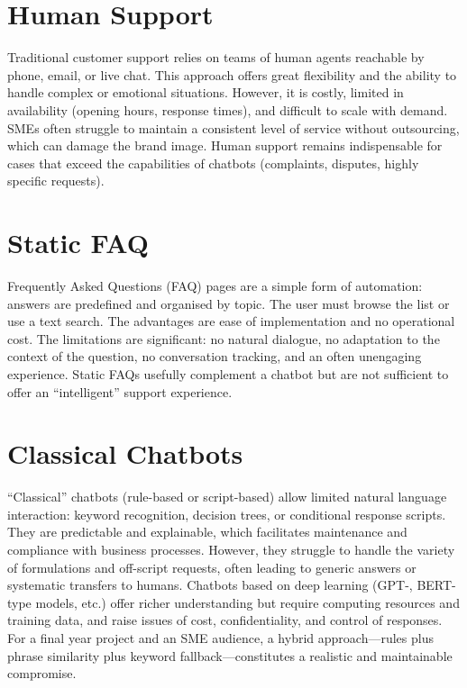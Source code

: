 \documentclass[12pt,a4paper]{report}
\begin{document}
\section{Human Support}

Traditional customer support relies on teams of human agents reachable by phone, email, or live chat. This approach offers great flexibility and the ability to handle complex or emotional situations. However, it is costly, limited in availability (opening hours, response times), and difficult to scale with demand. SMEs often struggle to maintain a consistent level of service without outsourcing, which can damage the brand image. Human support remains indispensable for cases that exceed the capabilities of chatbots (complaints, disputes, highly specific requests).

\section{Static FAQ}

Frequently Asked Questions (FAQ) pages are a simple form of automation: answers are predefined and organised by topic. The user must browse the list or use a text search. The advantages are ease of implementation and no operational cost. The limitations are significant: no natural dialogue, no adaptation to the context of the question, no conversation tracking, and an often unengaging experience. Static FAQs usefully complement a chatbot but are not sufficient to offer an ``intelligent'' support experience.

\section{Classical Chatbots}

``Classical'' chatbots (rule-based or script-based) allow limited natural language interaction: keyword recognition, decision trees, or conditional response scripts. They are predictable and explainable, which facilitates maintenance and compliance with business processes. However, they struggle to handle the variety of formulations and off-script requests, often leading to generic answers or systematic transfers to humans. Chatbots based on deep learning (GPT-, BERT-type models, etc.) offer richer understanding but require computing resources and training data, and raise issues of cost, confidentiality, and control of responses. For a final year project and an SME audience, a hybrid approach---rules plus phrase similarity plus keyword fallback---constitutes a realistic and maintainable compromise.
\end{document}
